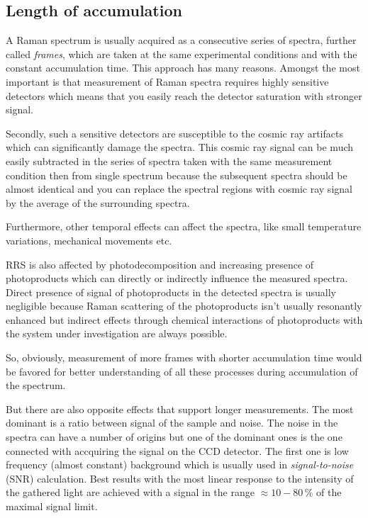 \subsection{Length of accumulation}

A Raman spectrum is usually acquired as a consecutive series of spectra,
further called \emph{frames}, which are taken at the same experimental
conditions and with the constant accumulation time. This approach has many
reasons. Amongst the most important is that measurement of Raman spectra
requires highly sensitive detectors which means that you easily reach the
detector saturation with stronger signal.

Secondly, such a sensitive detectors are susceptible to the cosmic ray
artifacts which can significantly damage the spectra. This cosmic ray signal
can be much easily subtracted in the series of spectra taken with the same
measurement condition then from single spectrum because the subsequent
spectra should be almost identical and you can replace the spectral regions
with cosmic ray signal by the average of the surrounding spectra.

Furthermore, other temporal effects can affect the spectra, like small
temperature variations, mechanical movements etc.

RRS is also affected by photodecomposition and increasing presence of
photoproducts which can directly or indirectly influence the measured spectra.
Direct presence of signal of photoproducts in the detected spectra is usually
negligible because Raman scattering of the photoproducts isn't usually
resonantly enhanced but indirect effects through chemical interactions of
photoproducts with the system under investigation are always possible.

So, obviously, measurement of more frames with shorter accumulation time would
be favored for better understanding of all these processes during accumulation
of the spectrum.

But there are also opposite effects that support longer measurements. The most
dominant is a ratio between signal of the sample and noise. The noise in the
spectra can have a number of origins but one of the dominant ones is the one
connected with accquiring the signal on the CCD detector. The first one is low
frequency (almost constant) background which is usually used in
\emph{signal-to-noise} (SNR) calculation. Best results with the most linear
response to the intensity of the gathered light are achieved with a signal in
the range $\approx 10 - 80\,\%$ of the maximal signal limit.

